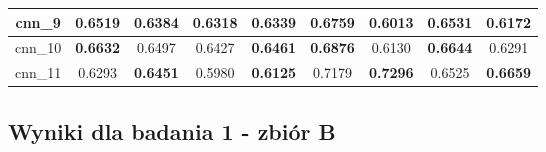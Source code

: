 \begin{table}[p]
\begin{tabular}{|c|c|c|c|c|c|c|c|c|}
        cnn\_9   & \textbf{0.6519}                     & 0.6384                              & 0.6318                              & \textbf{0.6339}                     & \textbf{0.6759}                     & 0.6013                              & \textbf{0.6531}                     & 0.6172                              \\ \hline
        cnn\_10  & \textbf{0.6632}                     & 0.6497                              & 0.6427                              & \textbf{0.6461}                     & \textbf{0.6876}                     & 0.6130                              & \textbf{0.6644}                     & 0.6291                              \\ \hline
        cnn\_11  & 0.6293                              & \textbf{0.6451}                     & 0.5980                              & \textbf{0.6125}                     & 0.7179                              & \textbf{0.7296}                     & 0.6525                              & \textbf{0.6659}                     \\ \hline
    \end{tabular}
\end{table}


\newpage %
\subsection{\label{wyniki_eksperymentow_eks_1b}Wyniki dla badania 1 - zbiór B}


